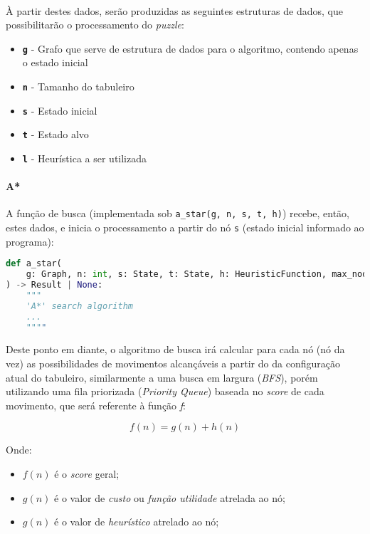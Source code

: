 \documentclass[12pt]{article}
\begin{document}
\paragraph{}
À partir destes dados, serão produzidas as seguintes estruturas de dados, que possibilitarão o processamento do \textit{puzzle}:

\begin{itemize}
\item \textbf{\texttt{g}} - Grafo que serve de estrutura de dados para o algoritmo, contendo apenas o estado inicial
\item \textbf{\texttt{n}} - Tamanho do tabuleiro
\item \textbf{\texttt{s}} - Estado inicial
\item \textbf{\texttt{t}} - Estado alvo
\item \textbf{\texttt{l}} - Heurística a ser utilizada
\end{itemize}

\paragraph{A*}
A função de busca (implementada sob \texttt{a\_star(g, n, s, t, h)}) recebe, então, estes dados, e inicia o
processamento a partir do nó \texttt{s} (estado inicial informado ao programa):

\begin{lstlisting}[language=python]
def a_star(
    g: Graph, n: int, s: State, t: State, h: HeuristicFunction, max_nodes: int = 400_000
) -> Result | None:
    """
    'A*' search algorithm
    ...
    """"
\end{lstlisting}

Deste ponto em diante, o algoritmo de busca irá calcular para cada nó (nó da vez) as possibilidades de movimentos
alcançáveis a partir do da configuração atual do tabuleiro, similarmente a uma busca em largura (\textit{BFS}), porém
utilizando uma fila priorizada (\textit{Priority Queue}) baseada no \textit{score} de cada movimento, que será referente
à função \textit{f}:

\begin{displaymath}
f(n) = g(n) + h(n)
\end{displaymath}

Onde:
\begin{itemize}
  \item $f(n)$ é o \textit{score} geral;
  \item $g(n)$ é o valor de \textit{custo} ou \textit{função utilidade} atrelada ao nó;
  \item $g(n)$ é o valor de \textit{heurístico} atrelado ao nó;
\end{itemize}
\end{document}
